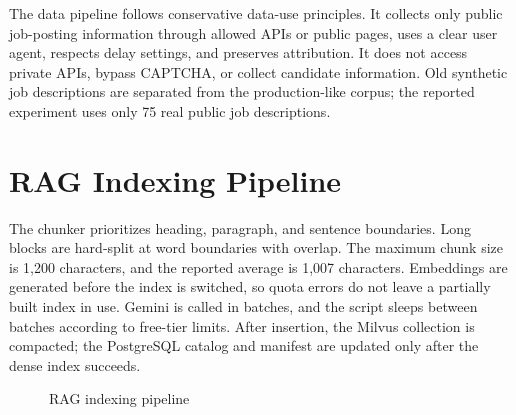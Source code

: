 \documentclass[12pt,a4paper,oneside]{report}
\begin{document}
The data pipeline follows conservative data-use principles. It collects only public job-posting information through allowed APIs or public pages, uses a clear user agent, respects delay settings, and preserves attribution. It does not access private APIs, bypass CAPTCHA, or collect candidate information. Old synthetic job descriptions are separated from the production-like corpus; the reported experiment uses only 75 real public job descriptions.

\section{RAG Indexing Pipeline}
The chunker prioritizes heading, paragraph, and sentence boundaries. Long blocks are hard-split at word boundaries with overlap. The maximum chunk size is 1,200 characters, and the reported average is 1,007 characters. Embeddings are generated before the index is switched, so quota errors do not leave a partially built index in use. Gemini is called in batches, and the script sleeps between batches according to free-tier limits. After insertion, the Milvus collection is compacted; the PostgreSQL catalog and manifest are updated only after the dense index succeeds.

\begin{figure}[H]
\centering
{}
\caption{RAG indexing pipeline}
\label{fig:index-pipeline}
\end{figure}
\end{document}
